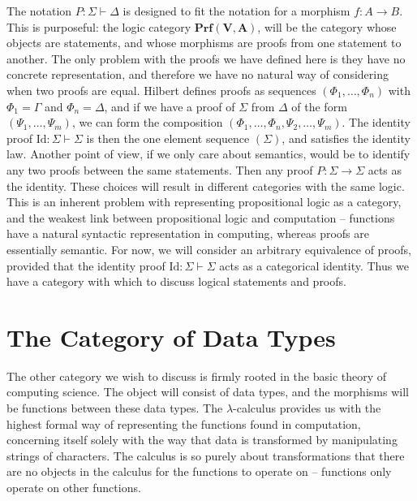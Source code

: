 \documentclass{article}
\theoremstyle{plain}
\begin{document}
The notation $P: \Sigma \vdash \Delta$ is designed to fit the notation for a morphism $f: A \to B$. This is purposeful: the logic category $\mathbf{Prf}(\mathbf{V}, \mathbf{A})$, will be the category whose objects are statements, and whose morphisms are proofs from one statement to another. The only problem with the proofs we have defined here is they have no concrete representation, and therefore we have no natural way of considering when two proofs are equal. Hilbert defines proofs as sequences $(\Phi_1, \dots, \Phi_n)$ with $\Phi_1 = \Gamma$ and $\Phi_n = \Delta$, and if we have a proof of $\Sigma$ from $\Delta$ of the form $(\Psi_1, \dots, \Psi_m)$, we can form the composition $(\Phi_1, \dots, \Phi_n, \Psi_2, \dots, \Psi_m)$. The identity proof $\text{Id}: \Sigma \vdash \Sigma$ is then the one element sequence $(\Sigma)$, and satisfies the identity law. Another point of view, if we only care about semantics, would be to identify any two proofs between the same statements. Then any proof $P: \Sigma \to \Sigma$ acts as the identity. These choices will result in different categories with the same logic. This is an inherent problem with representing propositional logic as a category, and the weakest link between propositional logic and computation -- functions have a natural syntactic representation in computing, whereas proofs are essentially semantic. For now, we will consider an arbitrary equivalence of proofs, provided that the identity proof $\text{Id}: \Sigma \vdash \Sigma$ acts as a categorical identity. Thus we have a category with which to discuss logical statements and proofs.

\section{The Category of Data Types}

The other category we wish to discuss is firmly rooted in the basic theory of computing science. The object will consist of data types, and the morphisms will be functions between these data types. The $\lambda$-calculus provides us with the highest formal way of representing the functions found in computation, concerning itself solely with the way that data is transformed by manipulating strings of characters. The calculus is so purely about transformations that there are no objects in the calculus for the functions to operate on -- functions only operate on other functions.
\end{document}
